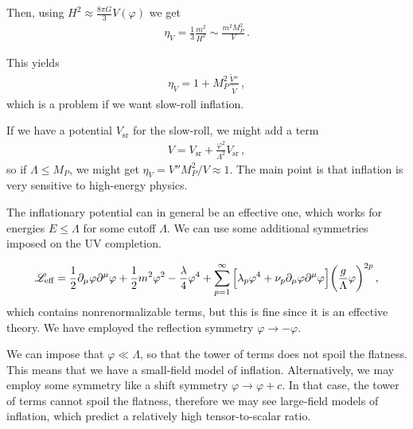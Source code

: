 \documentclass[main.tex]{subfiles}
\begin{document}
Then, using \(H^2 \approx \frac{8 \pi G}{3} V(\varphi )\) we get 
%
\begin{align}
\eta _V = \frac{1}{3} \frac{m^2}{H^2} \sim \frac{m^2 M_P^2}{V}
\,.
\end{align}

This yields 
%
\begin{align}
\eta _V = 1 + M_P^2 \frac{\widetilde{V}''}{\widetilde{V}}
\,,
\end{align}
%
which is a problem if we want slow-roll inflation. 

If we have a potential \(V _{\text{sr}}\) for the slow-roll, we might add a term 
%
\begin{align}
V = V _{\text{sr}} + \frac{\varphi^2}{\Lambda^2} V _{\text{sr}}
\,,
\end{align}
%
so if \(\Lambda \leq M_P\), we might get \(\eta _V = V'' M_P^2 / V \approx 1\). 
The main point is that inflation is very sensitive to high-energy physics. 

The inflationary potential can in general be an effective one, which works for energies \(E \leq \Lambda \) for some cutoff \(\Lambda \). 
We can use some additional symmetries imposed on the UV completion. 

%
\begin{align}
\mathscr{L} _{\text{eff}} = \frac{1}{2} \partial_{\mu } \varphi \partial^{\mu } \varphi + \frac{1}{2} m^2 \varphi^2 - \frac{\lambda}{4} \varphi^{4}
+ \sum _{p=1}^{\infty } \qty[\lambda _p \varphi^{4} + \nu _p \partial_{\mu } \varphi \partial^{\mu }\varphi ] \qty( \frac{g}{\Lambda } \varphi )^{2p}
\,,
\end{align}
%
which contains nonrenormalizable terms, but this is fine since it is an effective theory. 
We have employed the reflection symmetry \(\varphi \to - \varphi \). 

We can impose that \(\varphi \ll \Lambda \), so that the tower of terms does not spoil the flatness. This means that we have a small-field model of inflation. 
Alternatively, we may employ some symmetry like a shift symmetry \(\varphi \to \varphi + c\). 
In that case, the tower of terms cannot spoil the flatness, therefore we may see large-field models of inflation, which predict a relatively high tensor-to-scalar ratio. 
\end{document}

